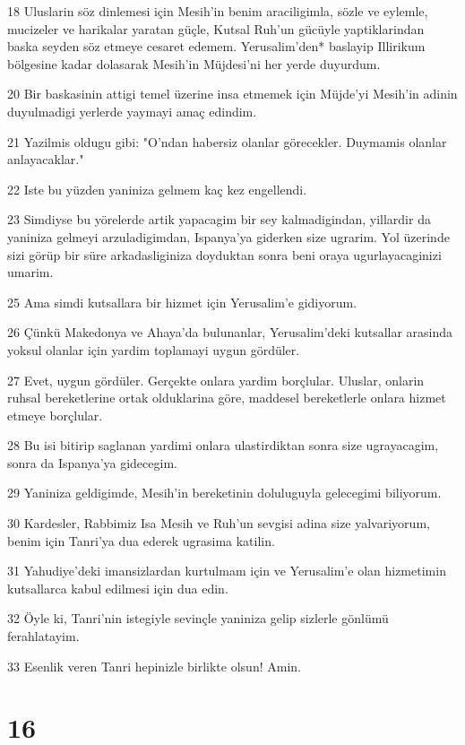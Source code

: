 \par 18 Uluslarin söz dinlemesi için Mesih'in benim araciligimla, sözle ve eylemle, mucizeler ve harikalar yaratan güçle, Kutsal Ruh'un gücüyle yaptiklarindan baska seyden söz etmeye cesaret edemem. Yerusalim'den* baslayip Illirikum bölgesine kadar dolasarak Mesih'in Müjdesi'ni her yerde duyurdum.
\par 20 Bir baskasinin attigi temel üzerine insa etmemek için Müjde'yi Mesih'in adinin duyulmadigi yerlerde yaymayi amaç edindim.
\par 21 Yazilmis oldugu gibi: "O'ndan habersiz olanlar görecekler. Duymamis olanlar anlayacaklar."
\par 22 Iste bu yüzden yaniniza gelmem kaç kez engellendi.
\par 23 Simdiyse bu yörelerde artik yapacagim bir sey kalmadigindan, yillardir da yaniniza gelmeyi arzuladigimdan, Ispanya'ya giderken size ugrarim. Yol üzerinde sizi görüp bir süre arkadasliginiza doyduktan sonra beni oraya ugurlayacaginizi umarim.
\par 25 Ama simdi kutsallara bir hizmet için Yerusalim'e gidiyorum.
\par 26 Çünkü Makedonya ve Ahaya'da bulunanlar, Yerusalim'deki kutsallar arasinda yoksul olanlar için yardim toplamayi uygun gördüler.
\par 27 Evet, uygun gördüler. Gerçekte onlara yardim borçlular. Uluslar, onlarin ruhsal bereketlerine ortak olduklarina göre, maddesel bereketlerle onlara hizmet etmeye borçlular.
\par 28 Bu isi bitirip saglanan yardimi onlara ulastirdiktan sonra size ugrayacagim, sonra da Ispanya'ya gidecegim.
\par 29 Yaniniza geldigimde, Mesih'in bereketinin doluluguyla gelecegimi biliyorum.
\par 30 Kardesler, Rabbimiz Isa Mesih ve Ruh'un sevgisi adina size yalvariyorum, benim için Tanri'ya dua ederek ugrasima katilin.
\par 31 Yahudiye'deki imansizlardan kurtulmam için ve Yerusalim'e olan hizmetimin kutsallarca kabul edilmesi için dua edin.
\par 32 Öyle ki, Tanri'nin istegiyle sevinçle yaniniza gelip sizlerle gönlümü ferahlatayim.
\par 33 Esenlik veren Tanri hepinizle birlikte olsun! Amin.

\chapter{16}

